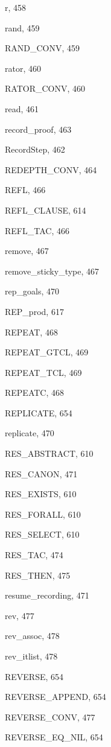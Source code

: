 \begin{theindex}
  \item {\ptt r}, 458
  \item {\ptt rand}, 459
  \item {\ptt RAND\_CONV}, 459
  \item {\ptt rator}, 460
  \item {\ptt RATOR\_CONV}, 460
  \item {\ptt read}, 461
  \item {\ptt record\_proof}, 463
  \item {\ptt RecordStep}, 462
  \item {\ptt REDEPTH\_CONV}, 464
  \item {\ptt REFL}, 466
  \item {\ptt REFL\_CLAUSE}, 614
  \item {\ptt REFL\_TAC}, 466
  \item {\ptt remove}, 467
  \item {\ptt remove\_sticky\_type}, 467
  \item {\ptt rep\_goals}, 470
  \item {\ptt REP\_prod}, 617
  \item {\ptt REPEAT}, 468
  \item {\ptt REPEAT\_GTCL}, 469
  \item {\ptt REPEAT\_TCL}, 469
  \item {\ptt REPEATC}, 468
  \item {\ptt REPLICATE}, 654
  \item {\ptt replicate}, 470
  \item {\ptt RES\_ABSTRACT}, 610
  \item {\ptt RES\_CANON}, 471
  \item {\ptt RES\_EXISTS}, 610
  \item {\ptt RES\_FORALL}, 610
  \item {\ptt RES\_SELECT}, 610
  \item {\ptt RES\_TAC}, 474
  \item {\ptt RES\_THEN}, 475
  \item {\ptt resume\_recording}, 471
  \item {\ptt rev}, 477
  \item {\ptt rev\_assoc}, 478
  \item {\ptt rev\_itlist}, 478
  \item {\ptt REVERSE}, 654
  \item {\ptt REVERSE\_APPEND}, 654
  \item {\ptt REVERSE\_CONV}, 477
  \item {\ptt REVERSE\_EQ\_NIL}, 654

\end{theindex}
